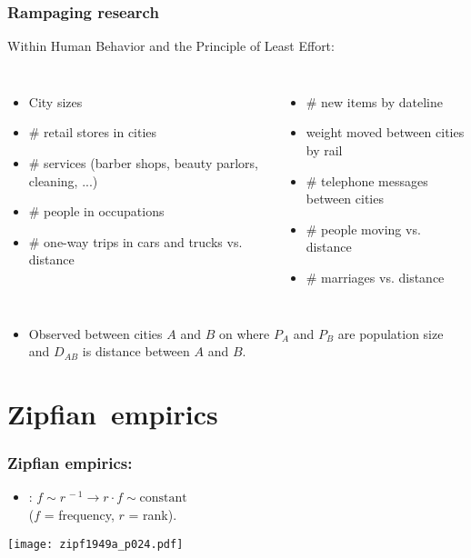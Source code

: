 \begin{frame}
  \frametitle{Rampaging research}

  \begin{block}{Within Human Behavior and the Principle of Least Effort:}
    \begin{columns}
      \begin{itemize}
      \item<1-> City sizes
      \item<1-> \# retail stores in cities
      \item<1-> \# services (barber shops, beauty parlors, cleaning, ...)
      \item<1-> \# people in occupations
      \item<1-> \# one-way trips in cars and trucks vs. distance
      \end{itemize}
      \begin{itemize}
      \item<1-> \# new items by dateline
      \item<1-> weight moved between cities by rail
      \item<1-> \# telephone messages between cities
      \item<1-> \# people moving vs. distance
      \item<1-> \# marriages vs. distance
      \end{itemize}
    \end{columns}
  \end{block}

  \begin{block}{}
  \begin{itemize}
  \item<2-> 
    Observed 
    between \alert{cities $A$ and $B$} on  where
    $P_A$ and $P_B$ are population size and 
    $D_{AB}$ is distance between $A$ and $B$.
  \end{itemize}
  \end{block}

\end{frame}

\section{Zipfian\ empirics}

\begin{frame}
  \frametitle{Zipfian empirics:}

  \begin{itemize}
  \item {}: $f \sim r^{\, -1} \rightarrow r\cdot f \sim \mbox{constant}$\\
    ($f$ = frequency, $r$ = rank).
  \end{itemize}

  \centering
  \texttt{[image: zipf1949a\_p024.pdf]}

\end{frame}

